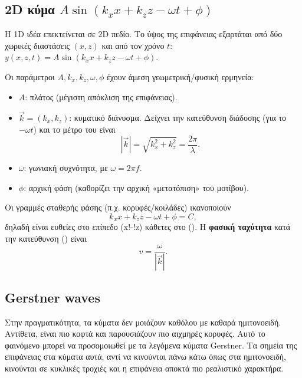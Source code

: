 \documentclass[
  a4paper,
  11pt,
]{article}
\providecommand{\tightlist}{%
  \setlength{\itemsep}{0pt}\setlength{\parskip}{0pt}}
\begin{document}
\subsection{\texorpdfstring{2D κύμα
\(A\sin(k_x x + k_z z - \omega t + \phi)\)}{2D κύμα A\textbackslash sin(k\_x x + k\_z z - \textbackslash omega t + \textbackslash phi)}}\label{d-ux3baux3cdux3bcux3b1-asink_x-x-k_z-z---omega-t-phi}

Η 1D ιδέα επεκτείνεται σε 2D πεδίο. Το ύψος της επιφάνειας εξαρτάται από
δύο χωρικές διαστάσεις \((x,z)\) και από τον χρόνο \(t\):
\(y(x,z,t)=A\sin(k_x x + k_z z - \omega t + \phi)\).

Οι παράμετροι \(A, k_x, k_z, \omega, \phi\) έχουν άμεση
γεωμετρική/φυσική ερμηνεία:

\begin{itemize}
\tightlist
\item
  \(A\): πλάτος (μέγιστη απόκλιση της επιφάνειας).
\item
  \(\vec{k}=(k_x,k_z)\): κυματικό διάνυσμα. Δείχνει την κατεύθυνση
  διάδοσης (για το \(-\omega t\)) και το μέτρο του είναι \[
  |\vec{k}|=\sqrt{k_x^2+k_z^2}=\frac{2\pi}{\lambda}.
  \]
\item
  \(\omega\): γωνιακή συχνότητα, με \(\omega=2\pi f\).
\item
  \(\phi\): αρχική φάση (καθορίζει την αρχική «μετατόπιση» του μοτίβου).
\end{itemize}

Οι γραμμές σταθερής φάσης (π.χ. κορυφές/κοιλάδες) ικανοποιούν \[
k_x x + k_z z - \omega t + \phi = C,
\] δηλαδή είναι ευθείες στο επίπεδο (x!-!z) κάθετες στο (). Η
\textbf{φασική ταχύτητα} κατά την κατεύθυνση () είναι \[
v=\frac{\omega}{|\vec{k}|}.
\]

\subsection{Gerstner waves}\label{gerstner-waves}

Στην πραγματικότητα, τα κύματα δεν μοιάζουν καθόλου με καθαρά
ημιτονοειδή. Αντίθετα, είναι πιο κοφτά και παρουσιάζουν πιο αιχμηρές
κορυφές. Αυτό το φαινόμενο μπορεί να προσομοιωθεί με τα λεγόμενα κύματα
Gerstner. Τα σημεία της επιφάνειας στα κύματα αυτά, αντί να κινούνται
πάνω κάτω όπως στα ημιτονοειδή, κινούνται σε κυκλικές τροχιές και η
επιφάνεια αποκτά πιο ρεαλιστικό χαρακτήρα.
\end{document}
